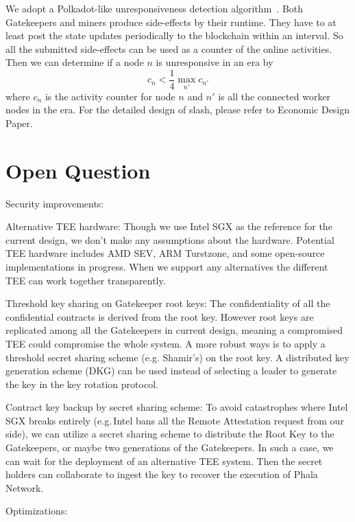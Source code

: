 We adopt a Polkadot-like unresponsiveness detection algorithm~\cite{polkadotslashing}. Both Gatekeepers and miners produce side-effects by their runtime. They have to at least post the state updates periodically to the blockchain within an interval. So all the submitted side-effects can be used as a counter of the online activities. Then we can determine if a node $n$ is unresponsive in an era by
$$
    c_n < \frac{1}{4} \max\limits_{n'}{c_{n'}}
$$
where $c_n$ is the activity counter for node $n$ and $n'$ is all the connected worker nodes in the era. For the detailed design of slash, please refer to Economic Design Paper.


\section{Open Question}

Security improvements:

\begin{icompact}
    \item Alternative TEE hardware: Though we use Intel SGX as the reference for the current design, we don't make any assumptions about the hardware. Potential TEE hardware includes AMD SEV, ARM Turstzone, and some open-source implementations in progress. When we support any alternatives the different TEE can work together transparently.
    \item Threshold key sharing on Gatekeeper root keys: The confidentiality of all the confidential contracts is derived from the root key. However root keys are replicated among all the Gatekeepers in current design, meaning a compromised TEE could compromise the whole system. A more robust ways is to apply a threshold secret sharing scheme (e.g. Shamir's) on the root key. A distributed key generation scheme (DKG) can be used instead of selecting a leader to generate the key in the key rotation protocol.
    \item Contract key backup by secret sharing scheme: To avoid catastrophes where Intel SGX breaks entirely (e.g.\,Intel bans all the Remote Attestation request from our side), we can utilize a secret sharing scheme to distribute the Root Key to the Gatekeepers, or maybe two generations of the Gatekeepers. In such a case, we can wait for the deployment of an alternative TEE system. Then the secret holders can collaborate to ingest the key to recover the execution of Phala Network.
\end{icompact}

Optimizations:

